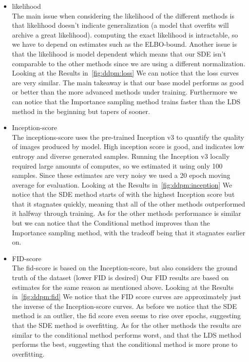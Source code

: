 \begin{itemize}
    \item likelihood\\
    The main issue when considering the likelihood of the different methods is that likelihood doesn't indicate generalization (a model that overfits will archive a great likelihood).
    computing the exact likelihood is intractable, so we have to depend on estimates such as the ELBO-bound. Another issue is that the likelihood is model dependent which means that our SDE isn't comparable to the other methods since we are using a different normalization.\\
    Looking at the Results in~\cref{fig:ddpm:loss} 
    We can notice that the loss curves are very similar.
    The main takeaway is that our base model performs as good or better than the more advanced methods under training.
    Furthermore we can notice that the Importance sampling method trains faster than the LDS method in the beginning but tapers of sooner. 
     
    \item Inception-score\\
    The inceptions-score uses the pre-trained Inception v3 to quantify the quality of images produced by model.
    High inception score is good, and indicates low entropy and diverse generated samples.
    Running the Inception v3 locally required large amounts of computes, so we estimated it using only 100 samples.
    Since these estimates are very noisy we used a 20 epoch moving average for evaluation.
    Looking at the Results in~\cref{fig:ddpm:inception}
    We notice that the SDE method starts of with the highest Inception score but that it stagnates quickly, meaning that all of the other methods outperformed it halfway through training.
    As for the other methods performance is similar but we can notice that the Conditional method improves than the Importance sampling method, with the tradeoff being that it stagnates earlier on.   
    
    \item FID-score\\
    The fid-score is based on the Inception-score, but also considers the ground truth of the dataset (lower FID is desired) Our FID results are based on estimates for the same reason as mentioned above.
    Looking at the Results in~\cref{fig:ddpm:fid}
    We notice that the FID score curves are approximately just the inverse of the Inception-score curves. As before we notice that the SDE method is an outlier, the fid score even seems to rise over epochs, suggesting that the SDE method is overfitting.
    As for the other methods the results are similar to the conditional method performs worst, and that the LDS method performs the best, suggesting that the conditional method is more prone to overfitting.
\end{itemize}